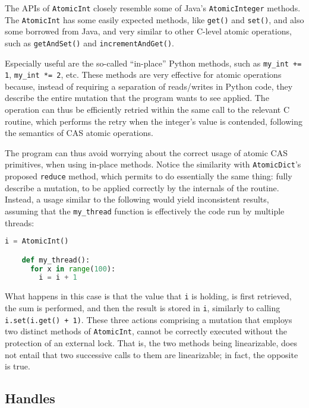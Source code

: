 The APIs of \texttt{AtomicInt} closely resemble some of Java's \texttt{AtomicInteger} methods.
The \texttt{AtomicInt} has some easily expected methods, like \texttt{{get()}} and \texttt{{set()}}, and also some borrowed from Java, and very similar to other C-level atomic operations, such as \texttt{getAndSet()} and \texttt{{incrementAndGet()}}.

Especially useful are the so-called ``in-place'' Python methods, such as \texttt{my\-\_int += 1}, \texttt{my\_int *= 2}, etc.
These methods are very effective for atomic operations because, instead of requiring a separation of reads/writes in Python code, they describe the entire mutation that the program wants to see applied.
The operation can thus be efficiently retried within the same call to the relevant C routine, which performs the retry when the integer's value is contended, following the semantics of CAS atomic operations\@.

The program can thus avoid worrying about the correct usage of atomic CAS primitives, when using in-place methods.
Notice the similarity with \texttt{Atomic\-Dict}'s proposed \texttt{reduce} method, which permits to do essentially the same thing: fully describe a mutation, to be applied correctly by the internals of the routine.
Instead, a usage similar to the following would yield inconsistent results, assuming that the \texttt{my\_thread} function is effectively the code run by multiple threads:
\begin{lstlisting}[label={lst:atomic-int-bad}, language=Python]
    i = AtomicInt()

    def my_thread():
      for x in range(100):
        i = i + 1
\end{lstlisting}

What happens in this case is that the value that \texttt{i} is holding, is first retrieved, the sum is performed, and then the result is stored in \texttt{i}, similarly to calling \texttt{{i.set(i.get() + 1)}}.
These three actions comprising a mutation that employs two distinct methods of \texttt{AtomicInt}, cannot be correctly executed without the protection of an external lock.
That is, the two methods being linearizable, does not entail that two successive calls to them are linearizable; in fact, the opposite is true.


\subsection{Handles}\label{subsec:atomic-int-handles}

